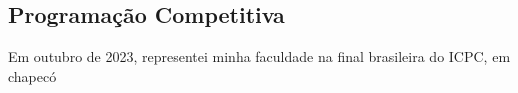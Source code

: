 \subsection{Programação Competitiva}
Em outubro de 2023, representei minha faculdade na final brasileira do ICPC, em chapecó
